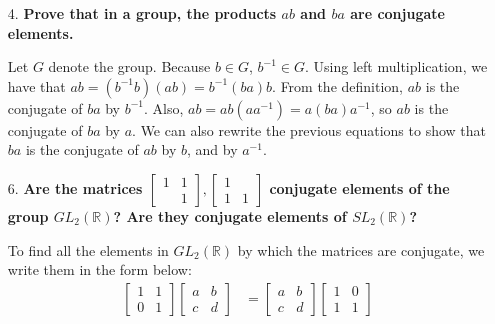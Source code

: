 \documentclass[a4paper,12pt]{article}
\begin{document}
\begin{enumerate}
    \item[4.]
        \boldmath
        \textbf{Prove that in a group, the products $ab$ and $ba$ are conjugate elements.} \par
        \unboldmath
        Let $G$ denote the group. Because $b \in G$, $b^{-1} \in G$. Using left multiplication, we have that $ab = (b^{-1}b) (ab) = b^{-1} (ba) b$. From the definition, $ab$ is the conjugate of $ba$ by $b^{-1}$. Also, $ab = ab (aa^{-1}) = a (ba) a^{-1}$, so $ab$ is the conjugate of $ba$ by $a$. We can also rewrite the previous equations to show that $ba$ is the conjugate of $ab$ by $b$, and by $a^{-1}$.

    \item[6.]
        \boldmath
        \textbf{Are the matrices $
            \left[ \begin{array}{cc}
                1 & 1 \\
                  & 1
            \end{array}\right],
            \left[ \begin{array}{cc}
                1 & \\
                1 & 1
            \end{array}\right]
        $ conjugate elements of the group $GL_2(\mathbb{R})$? Are they conjugate elements of $SL_2(\mathbb{R})$?} \par
        \unboldmath
        To find all the elements in $GL_2(\mathbb{R})$ by which the matrices are conjugate, we write them in the form below:
        \begin{align*}
            \left[ \begin{array}{cc}
                    1 & 1 \\
                    0 & 1
            \end{array} \right]
            \left[ \begin{array}{cc}
                    a & b \\
                    c & d
            \end{array} \right]
            &= \left[ \begin{array}{cc}
                    a & b \\
                    c & d
            \end{array} \right]
            \left[ \begin{array}{cc}
                    1 & 0 \\
                    1 & 1
            \end{array} \right] \\

\end{align*}
\end{enumerate}
\end{document}
